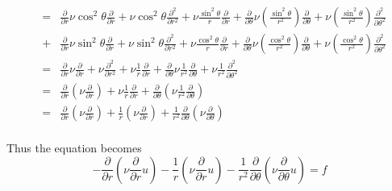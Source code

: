 \documentclass[11pt,letterpaper]{article}
\begin{document}
\begin{eqnarray}
&=& \frac{\partial}{\partial r} \nu \cos^2\theta\frac{\partial}{\partial r} + \nu\cos^2\theta\frac{\partial^2}{\partial r^2} + \nu \frac{\sin^2\theta}{r} \frac{\partial}{\partial r} + \frac{\partial}{\partial \theta} \nu (\frac{\sin^2\theta}{r^2}) \frac{\partial}{\partial \theta} + \nu(\frac{\sin^2\theta}{r^2})\frac{\partial^2}{\partial\theta^2} \\
&+& \frac{\partial}{\partial r} \nu \sin^2\theta\frac{\partial}{\partial r} + \nu\sin^2\theta\frac{\partial^2}{\partial r^2} + \nu \frac{\cos^2\theta}{r} \frac{\partial}{\partial r} + \frac{\partial}{\partial \theta} \nu (\frac{\cos^2\theta}{r^2}) \frac{\partial}{\partial \theta} + \nu(\frac{\cos^2\theta}{r^2})\frac{\partial^2}{\partial\theta^2}\\
&=& \frac{\partial}{\partial r} \nu \frac{\partial}{\partial r} + \nu\frac{\partial^2}{\partial r^2} + \nu \frac{1}{r} \frac{\partial}{\partial r} + \frac{\partial}{\partial \theta} \nu \frac{1}{r^2} \frac{\partial}{\partial \theta} + \nu\frac{1}{r^2}\frac{\partial^2}{\partial\theta^2} \\
&=& \frac{\partial}{\partial r} (\nu \frac{\partial}{\partial r}) + \nu \frac{1}{r} \frac{\partial}{\partial r} + \frac{\partial}{\partial \theta} (\nu \frac{1}{r^2} \frac{\partial}{\partial \theta}) \\
&=& \frac{\partial}{\partial r} (\nu \frac{\partial}{\partial r}) + \frac{1}{r} (\nu \frac{\partial}{\partial r}) + \frac{1}{r^2}\frac{\partial}{\partial \theta} (\nu  \frac{\partial}{\partial \theta}) \\
\end{eqnarray}

Thus the equation becomes
\begin{equation}
- \frac{\partial}{\partial r} (\nu \frac{\partial}{\partial r} u ) - \frac{1}{r} (\nu \frac{\partial}{\partial r} u ) - \frac{1}{r^2}\frac{\partial}{\partial \theta} (\nu  \frac{\partial}{\partial \theta} u ) = f
\end{equation}
\end{document}
